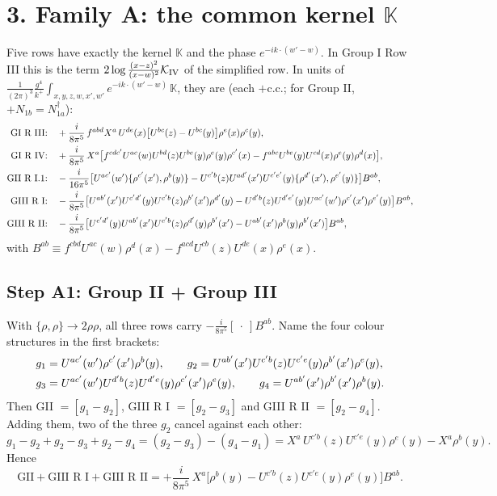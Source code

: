 \documentclass[10pt]{article}
\begin{document}
\section*{3. Family A: the common kernel $\mathbb K$}
Five rows have exactly the kernel $\mathbb K$ and the phase $e^{-ik\cdot(w'-w)}$. In Group I Row III this is the term $2\log\frac{(x-z)^{2}}{(x-w)^{2}}\mathcal K_{\rm IV}$ of the simplified row. In units of $\frac{1}{(2\pi)^{3}}\frac{g^{4}}{k^{+}}\int_{x,y,z,w,x',w'}e^{-ik\cdot(w'-w)}\,\mathbb K$, they are (each $+$c.c.; for Group II, $+N_{1b}=N_{1a}^{\dagger}$):
\begin{align}
\text{GI R III:}&\quad+\frac{i}{8\pi^{5}}\,f^{abd}X^{a}\,U^{de}(x)\big[U^{bc}(z)-U^{bc}(y)\big]\rho^{e}(x)\rho^{c}(y),\notag\\
\text{GI R IV:}&\quad+\frac{i}{8\pi^{5}}\,X^{a}\big[f^{cdc'}U^{ac}(w)U^{bd}(z)U^{be}(y)\rho^{e}(y)\rho^{c'}(x)-f^{abc}U^{be}(y)U^{cd}(x)\rho^{e}(y)\rho^{d}(x)\big],\notag\\
\text{GII R I.1:}&\quad-\frac{i}{16\pi^{5}}\big[U^{ac'}(w')\{\rho^{c'}(x'),\rho^{b}(y)\}-U^{c'b}(z)U^{ad'}(x')U^{c'e'}(y)\{\rho^{d'}(x'),\rho^{e'}(y)\}\big]B^{ab},\notag\\
\text{GIII R I:}&\quad-\frac{i}{8\pi^{5}}\big[U^{ab'}(x')U^{c'd'}(y)U^{c'b}(z)\rho^{b'}(x')\rho^{d'}(y)-U^{d'b}(z)U^{d'e'}(y)U^{ac'}(w')\rho^{c'}(x')\rho^{e'}(y)\big]B^{ab},\notag\\
\text{GIII R II:}&\quad-\frac{i}{8\pi^{5}}\big[U^{c'd'}(y)U^{ab'}(x')U^{c'b}(z)\rho^{d'}(y)\rho^{b'}(x')-U^{ab'}(x')\rho^{b}(y)\rho^{b'}(x')\big]B^{ab},
\end{align}
with $B^{ab}\equiv f^{cbd}U^{ac}(w)\rho^{d}(x)-f^{acd}U^{cb}(z)U^{de}(x)\rho^{e}(x)$.

\subsection*{Step A1: Group II + Group III}
With $\{\rho,\rho\}\to2\rho\rho$, all three rows carry $-\frac{i}{8\pi^{5}}[\ \cdot\ ]B^{ab}$. Name the four colour structures in the first brackets:
\begin{align}
&g_{1}=U^{ac'}(w')\rho^{c'}(x')\rho^{b}(y),\qquad g_{2}=U^{ab'}(x')U^{c'b}(z)U^{c'e}(y)\rho^{b'}(x')\rho^{e}(y),\notag\\
&g_{3}=U^{ac'}(w')U^{d'b}(z)U^{d'e}(y)\rho^{c'}(x')\rho^{e}(y),\qquad g_{4}=U^{ab'}(x')\rho^{b'}(x')\rho^{b}(y).
\end{align}
Then GII $=[g_{1}-g_{2}]$, GIII R I $=[g_{2}-g_{3}]$ and GIII R II $=[g_{2}-g_{4}]$. Adding them, two of the three $g_{2}$ cancel against each other:
\begin{equation}
g_{1}-g_{2}+g_{2}-g_{3}+g_{2}-g_{4}=(g_{2}-g_{3})-(g_{4}-g_{1})=X^{a}\,U^{c'b}(z)U^{c'e}(y)\rho^{e}(y)-X^{a}\rho^{b}(y).
\end{equation}
Hence
\begin{equation}
\text{GII}+\text{GIII R I}+\text{GIII R II}=+\frac{i}{8\pi^{5}}\,X^{a}\big[\rho^{b}(y)-U^{c'b}(z)U^{c'e}(y)\rho^{e}(y)\big]B^{ab}.
\end{equation}
\end{document}
